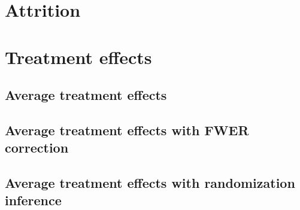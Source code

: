 \documentclass[11pt]{article}
\begin{document}
	\clearpage

\section{Attrition}

	

	
	
	
	
	

	
	
	
	

	\clearpage

\section{Treatment effects}

	\subsection{Average treatment effects}

		
        
        
		
		
		
		
		
		

	\clearpage

    \subsection{Average treatment effects with FWER correction}

        
        
        
        
        
        
        
        
        

    \clearpage

    \subsection{Average treatment effects with randomization inference}
\end{document}
